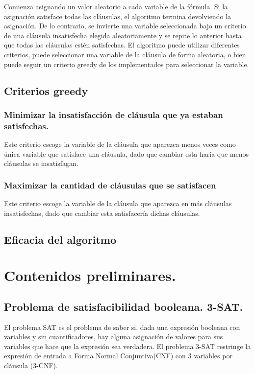 \documentclass[article]{llncs}
\begin{document}
Comienza asignando un valor aleatorio a cada variable de la fórmula. Si la asignación satisface todas las cláusulas, 
el algoritmo termina devolviendo la asignación. De lo contrario, se invierte una variable seleccionada bajo un criterio de
una cláusula insatisfecha elegida aleatoriamente y se repite lo anterior hasta que todas las cláusulas estén satisfechas. 
El algoritmo puede utilizar diferentes criterios, puede seleccionar una variable de la cláusula de forma aleatoria, o bien 
puede seguir un criterio greedy de los implementados para seleccionar la variable.

\subsection{Criterios greedy}

\subsubsection{Minimizar la insatisfacción de cláusula que ya estaban satisfechas.}

Este criterio escoge la variable de la cláusula que aparezca menos veces como única variable que satisface una cláusula, dado que cambiar esta
haría que menos cláusulas se insatisfagan.

\subsubsection{Maximizar la cantidad de cláusulas que se satisfacen}

Este criterio escoge la variable de la cláusula que aparezca en más cláusulas insatisfechas, dado que cambiar esta satisfacería
dichas cláusulas.

\subsection{Eficacia del algoritmo}

\section{Contenidos preliminares.}

\subsection{Problema de satisfacibilidad booleana. 3-SAT.}

El problema SAT es el problema de saber si, dada una expresión booleana con variables y sin cuantificadores, 
hay alguna asignación de valores para sus variables que hace que la expresión sea verdadera. El problema 3-SAT restringe 
la expresión de entrada a Forma Normal Conjuntiva(CNF) con 3 variables por cláusula (3-CNF).
\end{document}
